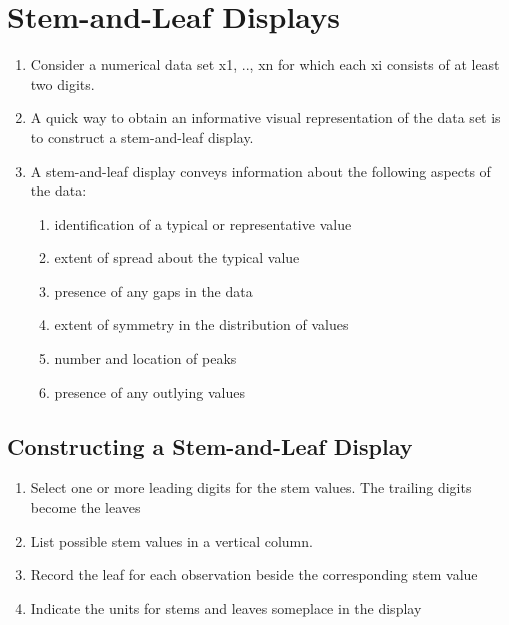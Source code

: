 \section{Stem-and-Leaf Displays \cite{ism-2,wiki-Stem-and-leaf_display}}\label{Stem-and-Leaf Displays}
\begin{enumerate}
    \item Consider a numerical data set x1, .., xn for which each xi consists of at least two digits. 
    \item A quick way to obtain an informative visual representation of the data set is to construct a stem-and-leaf display.
    \item A stem-and-leaf display conveys information about the following aspects of the data:
    \begin{enumerate}
        \item identification of a typical or representative value
        \item extent of spread about the typical value
        \item presence of any gaps in the data
        \item extent of symmetry in the distribution of values
        \item number and location of peaks
        \item presence of any outlying values
    \end{enumerate}
\end{enumerate}

\subsection{Constructing a Stem-and-Leaf Display}
\begin{enumerate}
    \item Select one or more leading digits for the stem values. The trailing digits become the leaves
    \item List possible stem values in a vertical column.
    \item Record the leaf for each observation beside the corresponding stem value
    \item Indicate the units for stems and leaves someplace in the display
\end{enumerate}
